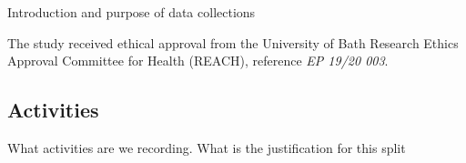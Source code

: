 Introduction and purpose of data collections

The study received ethical approval from the University of Bath Research Ethics Approval Committee for Health (REACH), reference \textit{EP 19/20 003}.

\subsection{Activities}
What activities are we recording. What is the justification for this split


